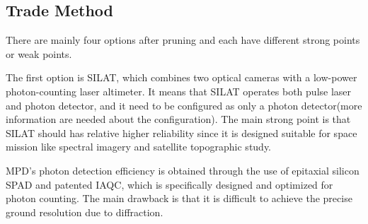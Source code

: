 \subsection{Trade Method}
\label{TOReceiverM}
There are mainly four options after pruning and each have different strong points or weak points. 

The first option is \ac{SILAT}, which combines two optical cameras with a low-power photon-counting laser altimeter. It means that \acs{SILAT} operates both pulse laser and photon detector, and it need to be configured as only a photon detector(more information are needed about the configuration). The main strong point is that \acs{SILAT} should has relative higher reliability since it is designed suitable for space mission like spectral imagery and satellite topographic study. 

\ac{MPD}'s photon detection efficiency is obtained through the use of epitaxial silicon \ac{SPAD} and patented \ac{IAQC}, which is specifically designed and optimized for photon counting. The main drawback is that it is difficult to achieve the precise ground resolution due to diffraction.

